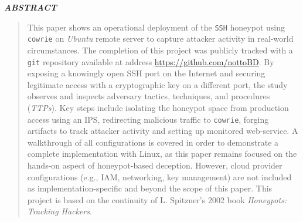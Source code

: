\documentclass{cls/ULBreport}
\renewenvironment{abstract}{%
  \clearpage
  \thispagestyle{plain}
  \begin{center}
    \bfseries\itshape ABSTRACT
  \end{center}
  \vspace{0.5cm}
  \begin{quote}
    \itshape
    \justifying
}{%
  \end{quote}
  \clearpage
}
\begin{document}
    
    \renewcommand{\rmdefault}{cmr} %
    \renewcommand{\sfdefault}{cmss} %
    \renewcommand{\ttdefault}{cmtt} %
    
    \makeatletter
    \renewcommand{\reset@font}{\normalfont\@setfontsize\f@size{12}{14.4}}
    \makeatother
    \normalfont


    \begin{abstract}        
    This paper shows an operational deployment of the \texttt{SSH} honeypot using \texttt{cowrie} on \textit{Ubuntu} remote server to capture attacker activity in real-world circumstances. The completion of this project was publicly tracked with a \texttt{git} repository available at address \href{https://github.com/nottoBD/cloud-honeypot/commits/master/}{https://github.com/nottoBD}. By exposing a knowingly open SSH port on the Internet and securing legitimate access with a cryptographic key on a different port, the study observes and inspects adversary tactics, techniques, and procedures (\textit{TTPs}). Key steps include isolating the honeypot space from production access using an IPS, redirecting malicious traffic to \texttt{cowrie}, forging artifacts to track attacker activity and setting up monitored web-service. A walkthrough of all configurations is covered in order to demonstrate a complete implementation with Linux, as this paper remains focused on the hands-on aspect of honeypot-based deception. However, cloud provider configurations (e.g., IAM, networking, key management) are not included as implementation-specific and beyond the scope of this paper. This project is based on the continuity of L. Spitzner's 2002 book \textit{Honeypots: Tracking Hackers}.
    \end{abstract}
    \newpage


\end{document}
